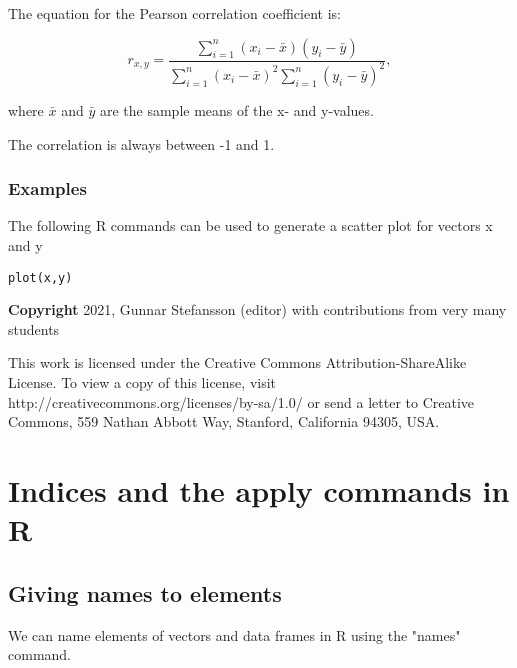 \documentclass[12pt,a4paper]{article}
\theoremstyle{regla}
\theoremstyle{remark}
\theoremstyle{definition}
\theoremstyle{nonumberbreak}
\begin{document}
The equation for the Pearson correlation coefficient is:  

$$
r_{x,y} = \frac{\sum_{i=1}^{n}(x_i - \bar{x})(y_i - \bar{y})}{\sum_{i=1}^{n}(x_i - \bar{x})^2\sum_{i=1}^{n}(y_i - \bar{y})^2}, 
$$

where $\bar{x}$ and $\bar{y}$ are the sample means of the x- and y-values.

The correlation is always between -1 and 1. 

\subsubsection{Examples}
The following R commands can be used to generate a scatter plot for vectors x and y
\begin{xmpl}
\begin{lstlisting}
plot(x,y) 
\end{lstlisting}
\end{xmpl}

{\bf Copyright}
2021, Gunnar Stefansson (editor) with contributions from very many students

This work is licensed under the Creative Commons
Attribution-ShareAlike License. To view a copy of this license, visit
http://creativecommons.org/licenses/by-sa/1.0/ or send a letter to
Creative Commons, 559 Nathan Abbott Way, Stanford, California 94305,
USA.
\clearpage
\section{Indices and the apply commands in R}
\subsection{Giving names to elements}
\begin{fbox}
\begin{minipage}{0.97\textwidth}
We can name elements of vectors and data frames in R using the "names" command.




\end{minipage}
\end{fbox}
\end{document}
